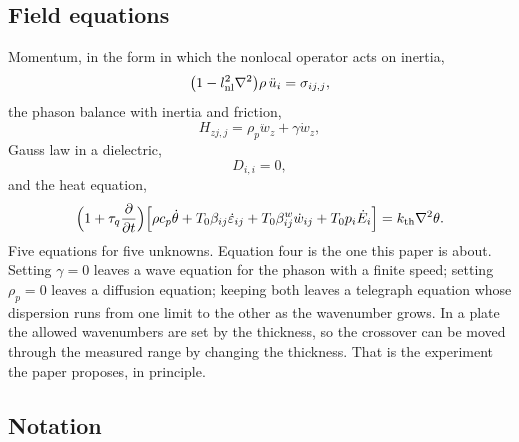 \documentclass[11pt]{article}
\begin{document}
\subsection{Field equations}

Momentum, in the form in which the nonlocal operator acts on inertia,
\begin{equation}
\bigl(1-l_{\rm nl}^2\nabla^2\bigr)\rho\,\ddot u_i=\sigma_{ij,j},
\end{equation}
the phason balance with inertia and friction,
\begin{equation}
H_{zj,j}=\rho_p\ddot w_z+\gamma\dot w_z ,
\end{equation}
Gauss law in a dielectric,
\begin{equation}
D_{i,i}=0 ,
\end{equation}
and the heat equation,
\begin{equation}
\Bigl(1+\tau_q\frac{\partial}{\partial t}\Bigr)
\Bigl[\rho c_p\dot\theta+T_0\beta_{ij}\dot\varepsilon_{ij}
+T_0\beta^{w}_{ij}\dot w_{ij}+T_0p_i\dot E_i\Bigr]
=k_{\rm th}\nabla^2\theta .
\end{equation}
Five equations for five unknowns. Equation four is the one this paper is about. Setting $\gamma=0$ leaves a
wave equation for the phason with a finite speed; setting $\rho_p=0$ leaves a diffusion equation; keeping
both leaves a telegraph equation whose dispersion runs from one limit to the other as the wavenumber grows.
In a plate the allowed wavenumbers are set by the thickness, so the crossover can be moved through the
measured range by changing the thickness. That is the experiment the paper proposes, in principle.

\subsection{Notation}
\end{document}
